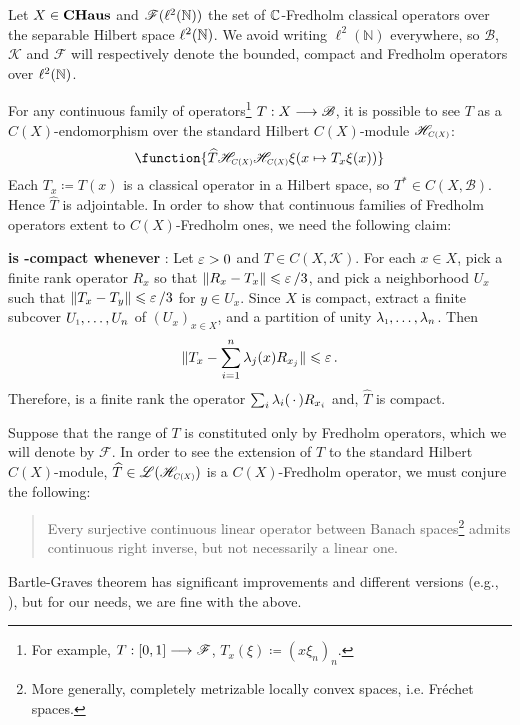 \begin{exemplo}[\cite{239982}]
    \label{exemplo: familia continua de operadores}
    Let $X \in \boldsymbol{\operatorname{CHaus}}$ and $\mathscr F(\ell^2(\operatorname{\mathbb{N}}))$ the set of $\operatorname{\mathbb{C}}$-Fredholm classical operators over the separable Hilbert space $\ell^2(\operatorname{\mathbb{N}})$. We avoid writing $\ell^2(\mathbb N)$ everywhere, so $\mathscr B$, $\mathscr K$ and $\mathscr F$ will respectively denote the bounded, compact and Fredholm operators over $\ell^2(\operatorname{\mathbb{N}})$.

    For any continuous family of operators\footnote{For example, $T: [0,1] \longrightarrow \mathscr F$, $T_x(\xi) \coloneqq (x\xi_n)_n$.} $T: X \longrightarrow \mathscr B$, it is possible to see $T$ as a $C(X)$-endomorphism over the standard Hilbert $C(X)$-module $\sub{\mathscr H}{C(X)}$:
    \begin{equation*}
        \function{{\widehat T}{\sub{\mathscr H}{C(X)}}{\sub{\mathscr H}{C(X)}}{\xi}{(x\mapsto T_x\xi(x))}}
    \end{equation*}
    Each $T_x\coloneqq T(x)$ is a classical operator in a Hilbert space, so $T^* \in C(X,\mathscr B)$. Hence $\widehat T$ is adjointable. In order to show that continuous families of Fredholm operators extent to $C(X)$-Fredholm ones, we need the following claim:
    \begin{itroman}
        \item \label{claim: hat T is C(X)-compact for T in C(X,K)} \textbf{ is -compact whenever }:
        Let $\operatorname{{\varepsilon}}>0$ and $T \in C(X, \mathscr K)$. For each $x \in X$, pick a finite rank operator $R_x$ so that $\| R_x-T_x\| \leqslant \operatorname{{\varepsilon}} /3$, and pick a neighborhood $U_x$ such that $\| T_x-T_y\| \leqslant \operatorname{{\varepsilon}}/3$ for $y \in U_x$. Since $X$ is compact, extract a finite subcover $\sub U1 , \ldots, U_n$ of $(U_x)_{x \in X}$, and a partition of unity $\sub\lambda1, \ldots, \lambda_n$. Then 
    $$\| T_x- \sum_{i=1}^n \lambda_j (x) R_{x_j} \|  \leqslant \operatorname{{\varepsilon}}.$$
    Therefore, is a finite rank the operator $\sum_{i} \lambda_i (\operatorname{\,\cdot\,}) R_{x_i}$ and, $\widehat T$ is compact.
    \end{itroman}


    Suppose that the range of $T$ is constituted only by Fredholm operators, which we will denote by $\mathscr F$. In order to see the extension of $T$ to the standard Hilbert $C(X)$-module, $\widehat T \in \adj(\sub{\mathscr H}{C(X)})$ is a $C(X)$-Fredholm operator, we must conjure the following:
    \begin{quote}
        \begin{invocacao}
        \label{teo: bartle graves}
        Every surjective continuous linear operator between Banach spaces\footnote{More generally, completely metrizable locally convex spaces, i.e. Fréchet spaces.} admits continuous right inverse, but not necessarily a linear one.
        \end{invocacao}
    \end{quote}
    Bartle-Graves theorem has significant improvements and different versions (e.g., \cite{dontchev2020bartle}), but for our needs, we are fine with the above. 


\end{exemplo}
